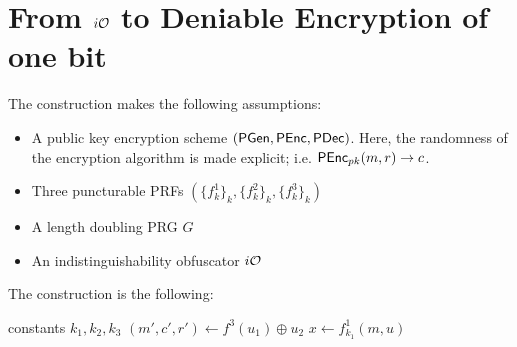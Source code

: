 \section{From $i\mathcal{O}$ to Deniable Encryption of one bit}

The construction makes the following assumptions:
\begin{itemize}
\item A public key encryption scheme $(\mathsf{PGen},\mathsf{PEnc},\mathsf{PDec})$. Here, the randomness of the encryption algorithm is made explicit; i.e. $\mathsf{PEnc}_{pk}(m,r)\to c$.
\item Three puncturable PRFs $(\{f_k^1\}_k,\{f_k^2\}_k,\{f_k^3\}_k)$
\item A length doubling PRG $G$
\item An indistinguishability obfuscator $i\mathcal{O}$
\end{itemize}

The construction is the following:


\newcommand*\Let[2]{\State #1 $\gets$ #2}

  \begin{algorithmic}[1]
      \State constants $k_1,k_2,k_3$
      \State $(m',c',r')\gets f^3(u_1)\oplus u_2$
          \State {}
      \Else
          \State $x\gets f^1_{k_1}(m,u)$
          \State {}
      \EndIf
    \EndFunction
  \end{algorithmic}